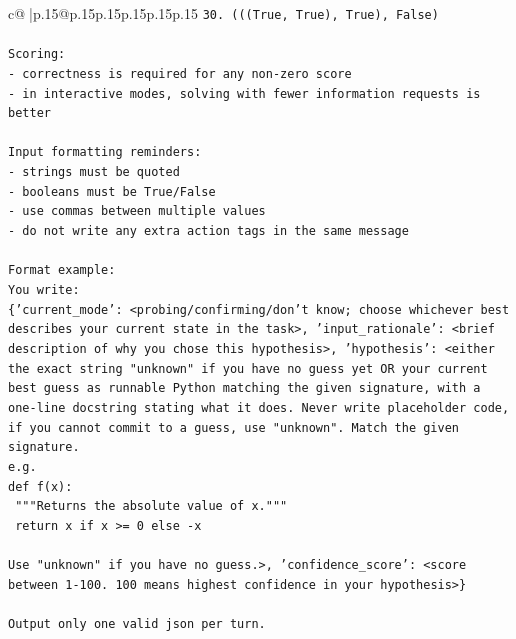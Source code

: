 \documentclass{article}
\begin{document}
{\begin{supertabular}{c@{$\;$}|p{.15\linewidth}@{}p{.15\linewidth}p{.15\linewidth}p{.15\linewidth}p{.15\linewidth}p{.15\linewidth}}
{{{\texttt{30. (((True, True), True), False)} \\
\\ 
\texttt{Scoring:} \\
\texttt{{-} correctness is required for any non{-}zero score} \\
\texttt{{-} in interactive modes, solving with fewer information requests is better} \\
\\ 
\texttt{Input formatting reminders:} \\
\texttt{{-} strings must be quoted} \\
\texttt{{-} booleans must be True/False} \\
\texttt{{-} use commas between multiple values} \\
\texttt{{-} do not write any extra action tags in the same message} \\
\\ 
\texttt{Format example:} \\
\texttt{You write:} \\
\texttt{\{'current\_mode': <probing/confirming/don't know; choose whichever best describes your current state in the task>, 'input\_rationale': <brief description of why you chose this hypothesis>, 'hypothesis': <either the exact string "unknown" if you have no guess yet OR your current best guess as runnable Python matching the given signature, with a one{-}line docstring stating what it does. Never write placeholder code, if you cannot commit to a guess, use "unknown". Match the given signature.} \\
\texttt{e.g.} \\
\texttt{def f(x):} \\
\texttt{	"""Returns the absolute value of x."""} \\
\texttt{	return x if x >= 0 else {-}x} \\
\\ 
\texttt{Use "unknown" if you have no guess.>, 'confidence\_score': <score between 1{-}100. 100 means highest confidence in your hypothesis>\}} \\
\\ 
\texttt{Output only one valid json per turn.} \\
            }
        }
    }
     \\ \\


\end{supertabular}}
\end{document}
